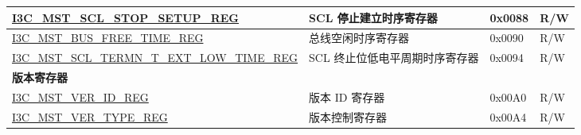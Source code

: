 \begin{longtable}{ | p{7.5cm} | p{6cm} | p{1.3cm} | p{1.5cm} | }
\hyperref[regdesc:I3CMSTSCLSTOPSETUPREG]{I3C\_MST\_SCL\_STOP\_SETUP\_REG} & SCL 停止建立时序寄存器 & 0x0088 & R/W \\ \hline
\hyperref[regdesc:I3CMSTBUSFREETIMEREG]{I3C\_MST\_BUS\_FREE\_TIME\_REG} & 总线空闲时序寄存器 & 0x0090 & R/W \\ \hline
\hyperref[regdesc:I3CMSTSCLTERMNTEXTLOWTIMEREG]{I3C\_MST\_SCL\_TERMN\_T\_EXT\_LOW\_TIME\_REG} & SCL 终止位低电平周期时序寄存器 & 0x0094 & R/W \\ \hline
\multicolumn{4}{|l|}{\textbf{版本寄存器}} \\ \hline
\hyperref[regdesc:I3CMSTVERIDREG]{I3C\_MST\_VER\_ID\_REG} & 版本 ID 寄存器 & 0x00A0 & R/W \\ \hline
\hyperref[regdesc:I3CMSTVERTYPEREG]{I3C\_MST\_VER\_TYPE\_REG} & 版本控制寄存器 & 0x00A4 & R/W \\ \hline
\end{longtable}

